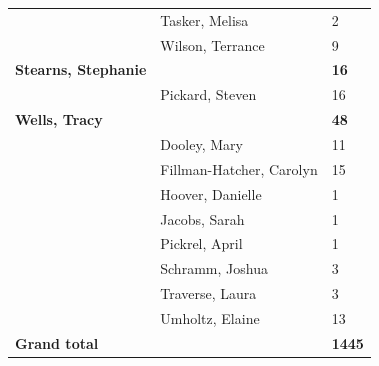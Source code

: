\documentclass{article}\usepackage[]{graphicx}\usepackage[]{color}
\begin{document}
{\begin{longtable} { >{\raggedright}p{}|p{}p{}}
   & Tasker, Melisa & 2 \\ 
   & Wilson, Terrance & 9 \\ 
  \textbf{Stearns, Stephanie} &  & \hspace{2cm}\textbf{16} \\ 
   \rowcolor[gray]{0.90} & Pickard, Steven & 16 \\ 
   \rowcolor[gray]{0.90}\textbf{Wells, Tracy} &  & \hspace{2cm}\textbf{48} \\ 
   \rowcolor[gray]{0.90} & Dooley, Mary & 11 \\ 
   & Fillman-Hatcher, Carolyn & 15 \\ 
   & Hoover, Danielle & 1 \\ 
   & Jacobs, Sarah & 1 \\ 
   \rowcolor[gray]{0.90} & Pickrel, April & 1 \\ 
   \rowcolor[gray]{0.90} & Schramm, Joshua & 3 \\ 
   \rowcolor[gray]{0.90} & Traverse, Laura & 3 \\ 
   & Umholtz, Elaine & 13 \\ 
  \textbf{Grand total} &  & \textbf{1445} \\ 
   \end{longtable}

}

\pagebreak
\end{document}
